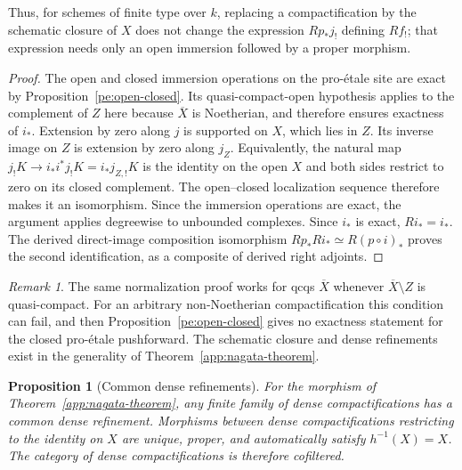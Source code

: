 \documentclass[11pt,a4paper]{article}
\numberwithin{equation}{section}
\newtheorem{proposition}[theorem]{Proposition}
\theoremstyle{definition}
\theoremstyle{remark}
\newtheorem{remark}[theorem]{Remark}
\begin{document}
Thus, for schemes of finite type over $k$, replacing a compactification
by the schematic closure of $X$ does not change the expression
$Rp_*j_!$ defining $Rf_!$; that expression needs only an open immersion
followed by a proper morphism.

\begin{proof}
The open and closed immersion operations on the pro-\'etale site
are exact by Proposition~\ref{pe:open-closed}. Its quasi-compact-open hypothesis applies to the
complement of $Z$ here because $\overline X$ is Noetherian, and
therefore ensures exactness of $i_*$. Extension by zero along $j$
is supported on $X$, which
lies in $Z$. Its inverse image on $Z$ is extension by zero along
$j_Z$. Equivalently, the natural map
$j_!K\to i_*i^*j_!K=i_*j_{Z,!}K$ is the identity on the open $X$
and both sides restrict to zero on its closed complement. The
open--closed localization sequence therefore makes it an
isomorphism. Since the immersion operations are exact, the argument
applies degreewise to unbounded complexes.
Since $i_*$ is exact, $Ri_*=i_*$. The derived direct-image
composition isomorphism $Rp_*Ri_*\simeq R(p\circ i)_*$ proves the
second identification, as a composite of derived right adjoints.
\end{proof}

\begin{remark}
The same normalization proof works for qcqs $\overline X$ whenever
$\overline X\setminus Z$ is quasi-compact. For an arbitrary
non-Noetherian compactification this condition can fail, and then
Proposition~\ref{pe:open-closed} gives no exactness statement for the
closed pro-\'etale pushforward. The schematic closure and dense
refinements exist in the generality of Theorem~\ref{app:nagata-theorem}.
\end{remark}

\begin{proposition}[Common dense refinements]
\label{app:nagata-refinement}
For the morphism of Theorem~\ref{app:nagata-theorem}, any finite family
of dense compactifications has a common dense refinement. Morphisms
between dense compactifications restricting to the identity on $X$
are unique, proper, and automatically satisfy $h^{-1}(X)=X$.
The category of dense compactifications is therefore cofiltered.
\end{proposition}
\end{document}
